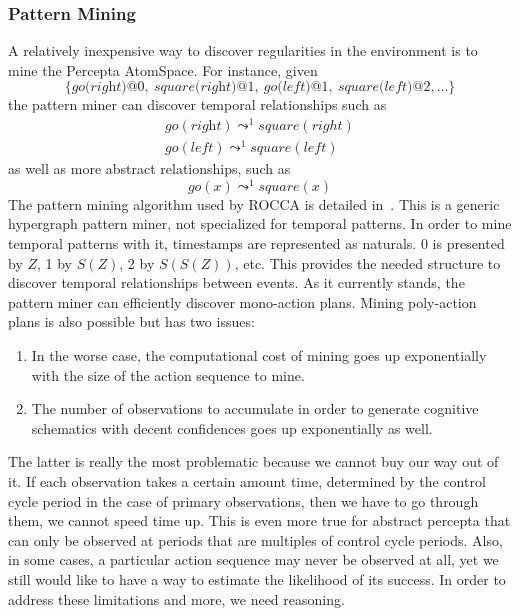 \documentclass[runningheads]{llncs}
\newcommand{\lpreimp}[1]{\leadsto^{#1}}
\newcommand{\lgo}[1]{\textit{go}(#1)}
\begin{document}
\subsubsection{Pattern Mining}
A relatively inexpensive way to discover regularities in the
environment is to mine the Percepta AtomSpace.  For instance, given
$$\{\textit{go(right)@0},\ \textit{square(right)@1},\
\textit{go(left)@1},\ \textit{square(left)@2}, \dots\}$$ the pattern
miner can discover temporal relationships such as
$$
\begin{array}{c}
  \lgo{\textit{right}} \lpreimp{1} square(right) \\
  \lgo{\textit{left}} \lpreimp{1} square(left)
\end{array}
$$
as well as more abstract relationships, such as
$$\lgo{x} \lpreimp{1} square(x)$$
The pattern mining algorithm used by ROCCA is detailed
in~\cite{Geisweiller2019}.  This is a generic hypergraph pattern
miner, not specialized for temporal patterns.  In order to mine
temporal patterns with it, timestamps are represented as naturals.  0
is presented by $Z$, 1 by $S(Z)$, 2 by $S(S(Z))$, etc.  This provides
the needed structure to discover temporal relationships between
events.  As it currently stands, the pattern miner can efficiently
discover mono-action plans.  Mining poly-action plans is also possible
but has two issues:
\begin{enumerate}
\item In the worse case, the computational cost of mining goes up
  exponentially with the size of the action sequence to mine.
\item The number of observations to accumulate in order to generate
  cognitive schematics with decent confidences goes up exponentially
  as well.
\end{enumerate}
The latter is really the most problematic because we cannot buy our
way out of it.  If each observation takes a certain amount time,
determined by the control cycle period in the case of primary
observations, then we have to go through them, we cannot speed time
up.  This is even more true for abstract percepta that can only be
observed at periods that are multiples of control cycle periods.
Also, in some cases, a particular action sequence may never be
observed at all, yet we still would like to have a way to estimate the
likelihood of its success.  In order to address these limitations and
more, we need reasoning.
\end{document}
